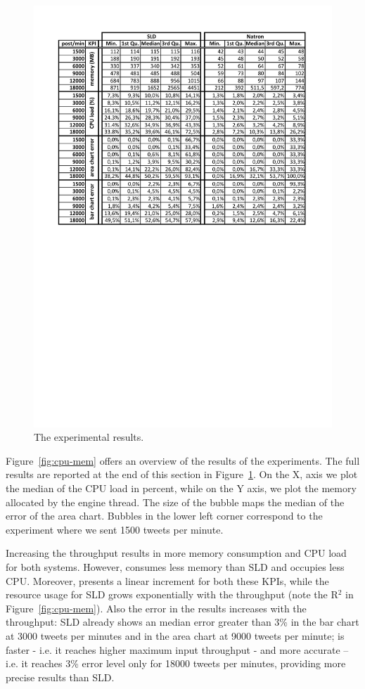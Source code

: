 \begin{figure}[t]
\centering
\includegraphics[width=\textwidth]{img/comp-mod-results}
\caption{The experimental results.}
\label{fig:all-data}
\end{figure}

Figure~\ref{fig:cpu-mem} offers an overview of the results of the experiments. The full results are reported at the end of this section in Figure~\ref{fig:all-data}. On the X, axis we plot the median of the CPU load in percent, while on the Y axis, we plot the memory allocated by the engine thread. The size of the bubble maps the median of the error of the area chart. Bubbles in the lower left corner correspond to the experiment where we sent 1500 tweets per minute.

Increasing the throughput results in more memory consumption and CPU load for both systems. However, \sti{} consumes less memory than SLD and occupies less CPU. Moreover, \sti{} presents a linear increment for both these KPIs, while the resource usage for SLD grows exponentially with the throughput (note the R$^2$ in Figure~\ref{fig:cpu-mem}). Also the error in the results increases with the throughput: SLD already shows an median error greater than 3\% in the bar chart at 3000 tweets per minutes and in the area chart at 9000 tweets per minute; \sti{} is faster - i.e. it reaches higher maximum input throughput - and more accurate -- i.e. it reaches 3\% error level only for 18000 tweets per minutes, providing more precise results than SLD.

